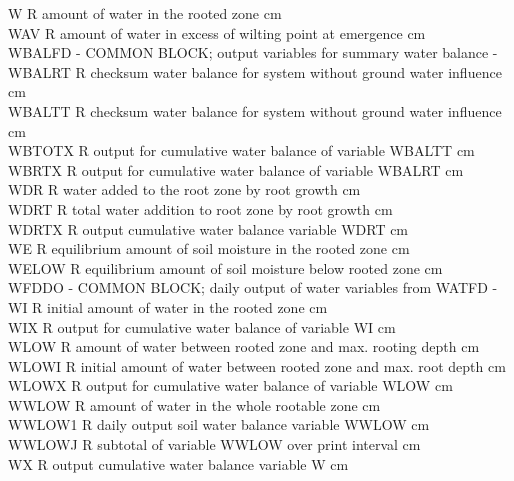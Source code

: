 \begin{tabbing}
W\> \> R\> amount of water in the rooted zone\> \> \> \> \> \> \> cm\\
WAV\> \> R\> amount of water in excess of wilting point at emergence \> \> \> \> \> \> \> cm\\
WBALFD\> \> -\> COMMON BLOCK; output variables for summary water balance\> \> \> \> \> \> \> -\\
WBALRT\> \> R\> checksum water balance for system without ground water influence\> \> \> \> \> \> \> cm\\
WBALTT\> \> R\> checksum water balance for system without ground water influence\> \> \> \> \> \> \> cm\\
WBTOTX\> \> R\> output for cumulative water balance of variable WBALTT\> \> \> \> \> \> \> cm\\
WBRTX\> \> R\> output for cumulative water balance of variable WBALRT\> \> \> \> \> \> \> cm\\
WDR\> \> R\> water added to the root zone by root growth\> \> \> \> \> \> \> cm\\
WDRT\> \> R\> total water addition to root zone by root growth\> \> \> \> \> \> \> cm\\
WDRTX\> \> R\> output cumulative water balance variable WDRT\> \> \> \> \> \> \> cm\\
WE\> \> R\> equilibrium amount of soil moisture in the rooted zone\> \> \> \> \> \> \> cm\\
WELOW\> \> R\> equilibrium amount of soil moisture below rooted zone\> \> \> \> \> \> \> cm\\
WFDDO\> \> -\> COMMON BLOCK; daily output of water variables from WATFD\> \> \> \> \> \> \> -\\
WI\> \> R\> initial amount of water in the rooted zone\> \> \> \> \> \> \> cm\\
WIX\> \> R\> output for cumulative water balance of variable WI\> \> \> \> \> \> \> cm\\
WLOW\> \> R\> amount of water between rooted zone and max. rooting depth\> \> \> \> \> \> \> cm\\
WLOWI\> \> R\> initial amount of water between rooted zone and max. root depth\> \> \> \> \> \> \> cm\\
WLOWX\> \> R\> output for cumulative water balance of variable WLOW\> \> \> \> \> \> \> cm\\
WWLOW\> \> R\> amount of water in the whole rootable zone\> \> \> \> \> \> \> cm\\
WWLOW1\> \> R\> daily output soil water balance variable WWLOW\> \> \> \> \> \> \> cm\\
WWLOWJ\> \> R\> subtotal of variable WWLOW over print interval\> \> \> \> \> \> \> cm\\
WX\> \> R\> output cumulative water balance variable W\> \> \> \> \> \> \> cm
\end{tabbing}

